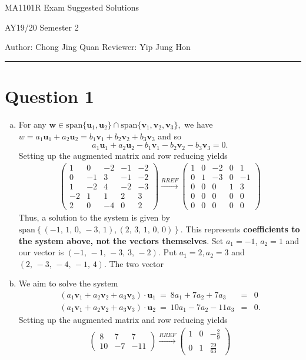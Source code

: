 \documentclass{article}
\newcommand{\matr}[1]{\mathbf{#1}}
\newcommand{\spn}{\text{span}}
\begin{document}
    {\LARGE{MA1101R Exam Suggested Solutions}}
    
    {\large{AY19/20 Semester 2}}
    \vspace{0.2in}
    
    Author: Chong Jing Quan \hfill Reviewer: Yip Jung Hon
    \par\noindent\rule{\textwidth}{0.4pt}
\section*{Question 1}
\begin{enumerate}[(a)]
    \item For any $\matr w\in\spn\{\matr u_1, \matr u_2\}\cap\spn\{\matr v_1,\matr v_2,\matr v_3\},$ we have $w=a_1\matr{u}_1+a_2\matr{u}_2=b_1\matr{v}_1+b_2\matr{v}_2+b_3\matr{v}_3$ and so $$a_1\matr{u}_1+a_2\matr{u}_2-b_1\matr{v}_1-b_2\matr{v}_2-b_3\matr{v}_3=0.$$
    Setting up the augmented matrix and row reducing yields
\begin{eqnarray*}
\left(\begin{array}{rrrrr}
1 & 0 & -2 & -1 & -2 \\
0 & -1 & 3 & -1 & -2 \\
1 & -2 & 4 & -2 & -3 \\
-2 & 1 & 1 & 2 & 3 \\
2 & 0 & -4 & 0 & 2
\end{array}\right) \xrightarrow[]{RREF} \left(\begin{array}{rrrrr}
1 & 0 & -2 & 0 & 1 \\
0 & 1 & -3 & 0 & -1 \\
0 & 0 & 0 & 1 & 3 \\
0 & 0 & 0 & 0 & 0 \\
0 & 0 & 0 & 0 & 0
\end{array}\right)
\end{eqnarray*}
Thus, a solution to the system is given by $\spn\left\{\left(-1,\,1,\,0,\,-3,\,1\right), \left(2,\,3,\,1,\,0,\,0\right)\right\}$. This represents \textbf{coefficients to the system above, not the vectors themselves}. Set $a_1=-1$, $a_2=1$ and our vector is $\left(-1,\,-1,\,-3,\,3,\,-2\right)$. Put $a_1=2, a_2=3$ and $\left(2,\,-3,\,-4,\,-1,\,4\right)$. The two vector
\item We aim to solve the system
\begin{eqnarray*}
(a_1\matr{v}_1+a_2\matr{v}_2+a_3\matr{v}_3)\cdot \matr{u}_1\ =\ 8a_1+7a_2+7a_3&=&0\\
(a_1\matr{v}_1+a_2\matr{v}_2+a_3\matr{v}_3)\cdot \matr{u}_2\ =\ 10a_1-7a_2-11a_3&=&0.
\end{eqnarray*}
Setting up the augmented matrix and row reducing yields
\begin{eqnarray*}
\left(\begin{array}{rrr}
8 & 7 & 7 \\
10 & -7 & -11
\end{array}\right)  \xrightarrow[]{RREF} \left(\begin{array}{rrr}
1 & 0 & -\frac{2}{9} \\
0 & 1 & \frac{79}{63}
\end{array}\right)
\end{eqnarray*}


\end{enumerate}
\end{document}

